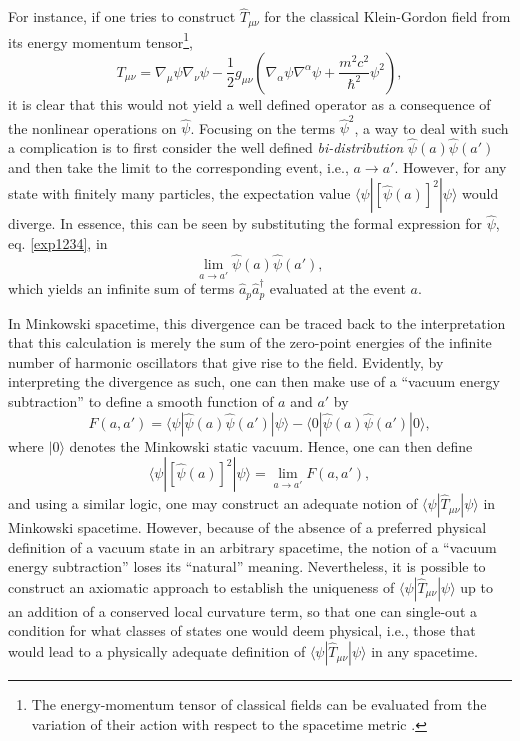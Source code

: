 \documentclass[
12pt,		%
openright,	%
twoside,  %
a4paper,			%
chapter=TITLE,		%
english,			%
french,				%
spanish,			%
brazil				%
]{USPSC-classe/USPSC}
\begin{document}
For instance, if one tries to construct $\hat{T}_{\mu\nu}$ for the classical Klein-Gordon field from its energy momentum tensor\footnote{The energy-momentum tensor of classical fields can be evaluated from the variation of their action with respect to the spacetime metric \cite{Parker2009}.},
\begin{equation}
    T_{\mu\nu}=\nabla_{\mu}\psi\nabla_{\nu}\psi-\frac{1}{2}g_{\mu\nu}(\nabla_{\alpha}\psi\nabla^{\alpha}\psi+\frac{m^2c^2}{\hbar^2}\psi^2),
\end{equation}
it is clear that this would not yield a well defined operator as a consequence of the nonlinear operations on $\hat{\psi}$. Focusing on the terms $\hat{\psi}^2$, a way to deal with such a complication is to first consider the well defined \textit{bi-distribution} $\hat{\psi}(a)\hat{\psi}(a')$ and then take the limit to the corresponding event, i.e., $a\to a'$. However, for any state with finitely many particles, the expectation value $\langle \psi|[\hat{\psi}(a)]^2|\psi\rangle$ would diverge. In essence, this can be seen by substituting the formal expression for $\hat{\psi}$, eq. \ref{exp1234}, in
\begin{equation}
   \lim_{a\to a'}\hat{\psi}(a)\hat{\psi}(a'),
\end{equation}
which yields an infinite sum of terms $\hat{a}_{p}\hat{a}_{p}^{\dag}$ evaluated at the event $a$.

In Minkowski spacetime, this divergence can be traced back to the interpretation that this calculation is merely the sum of the zero-point energies of the infinite number of harmonic oscillators that give rise to the field. Evidently, by interpreting the divergence as such, one can then make use of a ``vacuum energy subtraction'' to define a smooth function of $a$ and $a'$ by
\begin{equation}\label{eqsubs}
    F(a,a')=\langle \psi|\hat{\psi}(a)\hat{\psi}(a')|\psi\rangle-\langle0|\hat{\psi}(a)\hat{\psi}(a')|0\rangle,
\end{equation}
 where $|0\rangle$ denotes the Minkowski static vacuum. Hence, one can then define 
\begin{equation}
    \langle \psi|[\hat{\psi}(a)]^2|\psi\rangle=\lim_{a\to a'}F(a,a'),
\end{equation}
and using a similar logic, one may construct an adequate notion of $\langle \psi|\hat{T}_{\mu\nu}|\psi\rangle$ in Minkowski spacetime. However, because of the absence of a preferred physical definition of a vacuum state in an arbitrary spacetime, the notion of a ``vacuum energy subtraction'' loses its ``natural'' meaning. Nevertheless, it is possible to construct an axiomatic approach to establish the uniqueness of $\langle \psi|\hat{T}_{\mu\nu}|\psi\rangle$ up to an addition of a conserved local curvature term, so that one can single-out a condition for what classes of states one would deem physical, i.e., those that would lead to a physically adequate definition of $\langle \psi|\hat{T}_{\mu\nu}|\psi\rangle$ in any spacetime.
\end{document}

